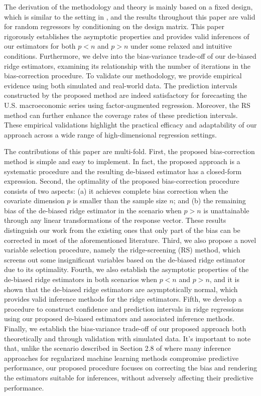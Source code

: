 The derivation of the methodology and theory is mainly based on a fixed design, which is similar to the setting in \cite{hansen2022modern}, and the results throughout this paper are valid for random regressors by conditioning on the design matrix. This paper rigorously establishes the asymptotic properties and provides valid inferences of our estimators for both $p< n$ and $p>n$ under some relaxed and intuitive conditions. Furthermore, we delve into the bias-variance trade-off of our de-biased ridge estimators, examining its relationship with the number of iterations in the bias-correction procedure. To validate our methodology, we provide empirical evidence using both simulated and real-world data.  The prediction intervals constructed by the proposed method are indeed satisfactory for forecasting the U.S. macroeconomic series using factor-augmented regression. Moreover, the RS method can further enhance the coverage rates of these prediction intervals. These empirical validations highlight the practical efficacy and adaptability of our approach across a wide range of high-dimensional regression settings.


The contributions of this paper are multi-fold. First, the proposed bias-correction method is simple and easy to implement. In fact, the proposed approach is a systematic procedure and the resulting de-biased estimator has a closed-form expression. Second, the optimality of the proposed bias-correction procedure consists of two aspects: (a) it achieves complete bias correction when the covariate dimension $p$ is smaller than the sample size $n$; and (b) the remaining bias of the de-biased ridge estimator in the scenario when $p>n$ is unattainable through any linear transformations of the response vector. These results distinguish our work from the existing ones that only part of the bias can be corrected in most of the aforementioned literature. Third, we also propose a novel variable selection procedure, namely the ridge-screening (RS) method, which screens out some insignificant variables based on the de-biased ridge estimator due to its optimality.  Fourth, we also establish the asymptotic properties of the de-biased ridge estimators in both scenarios when $p< n$ and $p>n$, and it is shown that the de-biased ridge estimators are asymptotically normal, which provides valid inference methods for the ridge estimators. Fifth, we develop a procedure to construct confidence and prediction intervals in ridge regressions using our proposed de-biased estimators and associated inference methods. Finally, we establish the bias-variance trade-off of our proposed approach both theoretically and through validation with simulated data. It's important to note that, unlike the scenario described in Section 2.8 of \cite{athey2019machine} where many inference approaches for regularized machine learning methods compromise predictive performance, our proposed procedure focuses  on correcting the bias and rendering the estimators suitable for inferences, without adversely affecting their predictive performance.
 
